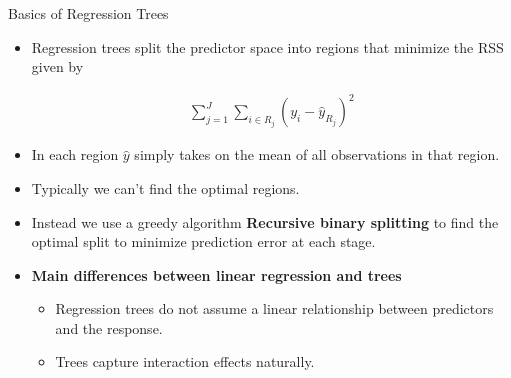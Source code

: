 \documentclass[10pt]{beamer}
\begin{document}
\begin{frame}{Basics of Regression Trees}
    \begin{itemize}
        \item Regression trees split the predictor space into regions that minimize the RSS given by
    
    \begin{align*}
        \sum_{j=1}^{J} \sum_{i \in R_j} ( y_i- \hat{ y}_{R_j} )^2
    \end{align*}
    
    
    \item In each region $\hat{y}$ simply takes on the mean of all observations in that region.
    
        \item Typically we can't find the optimal regions.
        \item Instead we use a greedy algorithm \textbf{Recursive binary splitting} to find the optimal split to minimize prediction error at each stage.
        
        \vspace{1cm}
        \item \textbf{Main differences between linear regression and trees}
        \begin{itemize}
            \item Regression trees do not assume a linear relationship between predictors and the response.
        
            \item Trees capture interaction effects naturally.
        \end{itemize}
       
    \end{itemize}
\end{frame}
\end{document}
